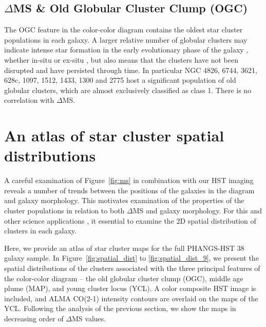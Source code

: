 \documentclass[linenumbers]{aastex63}
\begin{document}
{\subsection{$\Delta$MS \& Old Globular Cluster Clump (OGC)}
The OGC feature in the color-color diagram contains the oldest star cluster populations in each galaxy. A larger relative number of globular clusters may indicate intense star formation in the early evolutionary phase of the galaxy \citep{BS06}, whether in-situ or ex-situ \citep[and references therein]{CG19}, but also means that the clusters have not been disrupted and have persisted through time. 
In particular NGC 4826, 6744, 3621, 628c, 1097, 1512, 1433, 1300 and 2775 host a significant population of old globular clusters, which are almost exclusively classified as class 1.  There is no correlation with $\Delta$MS.





\section{An atlas of star cluster spatial distributions}\label{sect:spatialdist}

A careful examination of Figure~\ref{fig:ms} in combination with our HST imaging reveals a number of trends between the positions of the galaxies in the diagram and galaxy morphology.  This motivates examination of the properties of the cluster populations in relation to both $\Delta$MS and galaxy morphology.  For this and other science applications \citep[e.g., calculation of correlation functions, constraints on star formation timescales, and comparison with simulations, e.g.,][]{Gouliermis14, grasha_spatial_2015, grasha_hierarchical_2017, grasha_spatial_2019, turner22}, it essential to examine the 2D spatial distribution of clusters in each galaxy.

Here, we provide an atlas of star cluster maps for the full PHANGS-HST 38 galaxy sample.  In Figure~\ref{fig:spatial_dist} to \ref{fig:spatial_dist_9}, we present the spatial distributions of the clusters associated with the three principal features of the color-color diagram -- the old globular cluster clump (OGC), middle age plume (MAP), and young cluster locus (YCL).  A color composite HST image is included, and ALMA CO(2-1) intensity contours are overlaid on the maps of the YCL. Following the analysis of the previous section, we show the maps in decreasing order of $\Delta$MS values.   

}
\end{document}
